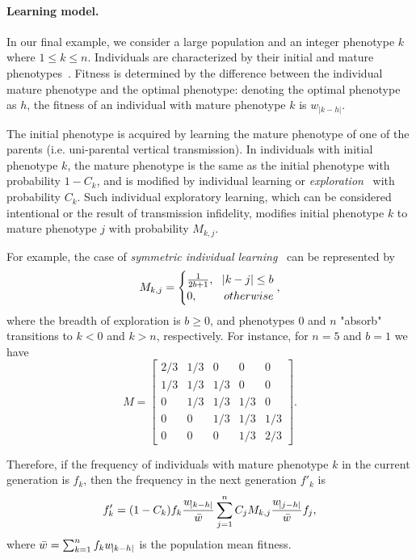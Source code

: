 \documentclass[9pt, a4paper, twocolumn]{extarticle}
\begin{document}
\paragraph*{Learning model.}\label{sec:learn_model}

In our final example, we consider a large population and an integer phenotype $k$ where $1 \le k \le n$.
Individuals are characterized by their initial and mature phenotypes~\citep[pg.~94]{Boyd1985}.
Fitness is determined by the difference between the individual mature phenotype and the optimal phenotype:
denoting the optimal phenotype as $h$, the fitness of an individual with mature phenotype $k$ is $w_{|k-h|}$.

The initial phenotype is acquired by learning the mature phenotype of one of the parents (i.e. uni-parental vertical transmission).
In individuals with initial phenotype $k$, the mature phenotype is the same as the initial phenotype with probability $1-C_k$, and is modified by individual learning or \emph{exploration}~\citep{Borenstein2008} with probability $C_k$.
Such individual exploratory learning, which can be considered intentional or the result of transmission infidelity, modifies initial phenotype $k$ to mature phenotype $j$ with probability $M_{k,j}$.

For example, the case of \emph{symmetric individual learning}~\citep{Borenstein2008} can be represented by
\begin{equation}
M_{k,j} = \begin{cases}
\frac{1}{2b+1}, & \abs{k-j} \le b \\
0, & otherwise
\end{cases},
\end{equation}
where the breadth of exploration is $b \ge 0$, and phenotypes $0$ and $n$ "absorb" transitions to $k<0$ and $k>n$, respectively. 
For instance, for $n=5$ and $b=1$ we have
\begin{equation}
M = \begin{bmatrix}
2/3 & 1/3 & 0 & 0 & 0 \\
1/3 & 1/3 & 1/3 & 0 & 0 \\
0 & 1/3 & 1/3 & 1/3 & 0 \\
0 & 0 & 1/3 & 1/3 & 1/3 \\
0 & 0 & 0 & 1/3 & 2/3
\end{bmatrix}.
\end{equation}
 
Therefore, if the frequency of individuals with mature phenotype $k$ in the current generation is $f_k$, then the frequency in the next generation $f'_k$ is
\begin{equation}
f'_k = (1-C_k) f_k \frac{w_{\abs{k-h}}}{\bar{w}} \sum_{j=1}^{n}{C_j M_{k,j} \frac{w_{\abs{j-h}}}{\bar{w}} f_j },
\end{equation}
where $\bar{w} = \sum_{k=1}^{n}{f_k w_{\abs{k-h}}}$ is the population mean fitness.
\end{document}
